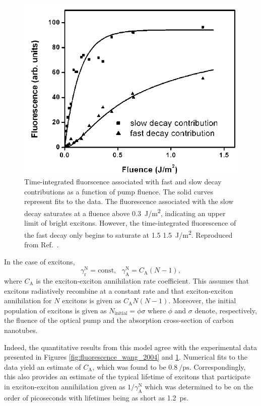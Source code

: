 \begin{figure}[H]
	\centering
	\includegraphics[scale=0.3]{images/chapter_prior_works/fast_slow_wang_2004}
	\caption{Time-integrated fluorscence associated with fast and slow decay contributions as a function of pump fluence. The solid curves represent fits to the data. The fluorescence associated with the slow decay saturates at a fluence above \SI{0.3}{\joule / \meter \squared}, indicating an upper limit of bright excitons. However, the time-integrated fluorescence of the fast decay only begins to saturate at 1.5  \SI{1.5}{\joule / \meter \squared}. Reproduced from Ref.\ \cite{wang2004observation}.}
	\label{fig:fast_slow_wang_2004}
\end{figure}


In the case of excitons,
\begin{equation}
	\gamma^\text{N}_\text{r} = \text{const}, \text{   } \gamma^\text{N}_\text{A} = C_\text{A}(N-1),
\end{equation}
where $C_\text{A}$ is the exciton-exciton annihilation rate coefficient. This assumes that excitons radiatively recombine at a constant rate and that exciton-exciton annihilation for $N$ excitons is given as $C_\text{A}N(N-1)$. Moreover, the initial population of excitons is given as $N_\text{initial} = \phi \sigma$ where $\phi$ and $\sigma$ denote, respectively, the fluence of the optical pump and the absorption cross-section of carbon nanotubes.


Indeed, the quantitative results from this model agree with the experimental data presented in Figures \ref{fig:fluorescence_wang_2004} and \ref{fig:fast_slow_wang_2004}. Numerical fits to the data yield an estimate of $C_\text{A}$, which was found to be $\SI{0.8}{\per\pico\second}$. Correspondingly, this also provides an estimate of the typical lifetime of excitons that participate in exciton-exciton annihilation given as $1/\gamma^\text{N}_\text{A}$ which was determined to be on the order of picoseconds with lifetimes being as short as \SI{1.2}{\pico \second}.



